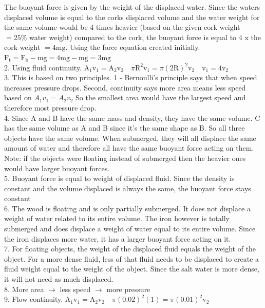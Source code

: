 \begin{enumerate}
The buoyant force is given by the weight of the displaced water. Since the waters displaced volume is equal to the corks displaced volume and the water weight for the same volume would be 4 times heavier (based on the given cork weight $=25 \%$ water weight) compared to the cork, the buoyant force is equal to 4 x the cork weight $=4 \mathrm{mg}$. Using the force equation created initially. $\mathrm{F}_{\mathrm{t}}=\mathrm{F}_{\mathrm{b}}-\mathrm{mg}=4 \mathrm{mg}-\mathrm{mg}=3 \mathrm{mg}$\\
2. Using fluid continuity. $\mathrm{A}_{1} \mathrm{v}_{1}=\mathrm{A}_{2} \mathrm{v}_{2} \quad \pi \mathrm{R}^{2} \mathrm{v}_{1}=\pi(2 \mathrm{R})^{2} \mathrm{v}_{2} \quad \mathrm{v}_{1}=4 \mathrm{v}_{2}$\\
3. This is based on two principles. 1 - Bernoulli's principle says that when speed increases pressure drops. Second, continuity says more area means less speed based on $A_{1} v_{1}=A_{2} v_{2}$ So the smallest area would have the largest speed and therefore most pressure drop.\\
4. Since A and B have the same mass and density, they have the same volume. C has the same volume as A and B since it's the same shape as B. So all three objects have the same volume. When submerged, they will all displace the same amount of water and therefore all have the same buoyant force acting on them. Note: if the objects were floating instead of submerged then the heavier ones would have larger buoyant forces.\\
5. Buoyant force is equal to weight of displaced fluid. Since the density is constant and the volume displaced is always the same, the buoyant force stays constant\\
6. The wood is floating and is only partially submerged. It does not displace a weight of water related to its entire volume. The iron however is totally submerged and does displace a weight of water equal to its entire volume. Since the iron displaces more water, it has a larger buoyant force acting on it.\\
7. For floating objects, the weight of the displaced fluid equals the weight of the object. For a more dense fluid, less of that fluid needs to be displaced to create a fluid weight equal to the weight of the object. Since the salt water is more dense, it will not need as much displaced.\\
8. More area $\rightarrow$ less speed $\rightarrow$ more pressure\\
9. Flow continuity. $\mathrm{A}_{1} \mathrm{v}_{1}=\mathrm{A}_{2} \mathrm{v}_{2} \quad \pi(0.02)^{2}(1)=\pi(0.01)^{2} \mathrm{v}_{2}$\\

\end{enumerate}
